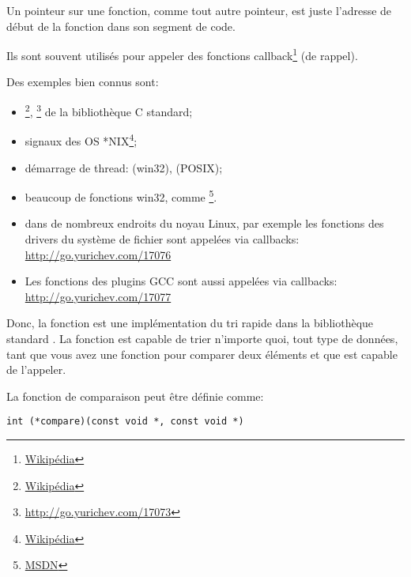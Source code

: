 \newcommand{\comp}{\TT{comp()}\xspace}
\label{sec:pointerstofunctions}

\myindex{\CLanguageElements!\Pointers}

Un pointeur sur une fonction, comme tout autre pointeur, est juste l'adresse de début
de la fonction dans son segment de code.

Ils sont souvent utilisés pour appeler des fonctions callback\footnote{\href{http://go.yurichev.com/17071}{Wikipédia}}
(de rappel).

Des exemples bien connus sont:

\begin{itemize}
\item \qsort\footnote{\href{http://go.yurichev.com/17072}{Wikipédia}},
{}\footnote{\url{http://go.yurichev.com/17073}} de la bibliothèque C standard; 

\item signaux des OS *NIX\footnote{\href{http://go.yurichev.com/17074}{Wikipédia}};

\item démarrage de thread:  (win32),  (POSIX);

\item beaucoup de fonctions win32, comme \footnote{\href{http://go.yurichev.com/17075}{MSDN}}.

\item dans de nombreux endroits du noyau Linux, par exemple les fonctions des drivers
du système de fichier sont appelées via callbacks: \url{http://go.yurichev.com/17076}

\item Les fonctions des plugins GCC sont aussi appelées via callbacks: 
\url{http://go.yurichev.com/17077}

\end{itemize}


Donc, la fonction \qsort est une implémentation du tri rapide dans la bibliothèque
standard \CCpp.
La fonction est capable de trier n'importe quoi, tout type de données, tant que vous
avez une fonction pour comparer deux éléments et que \qsort est capable de l'appeler.

La fonction de comparaison peut être définie comme:

\begin{lstlisting}
int (*compare)(const void *, const void *)
\end{lstlisting}

